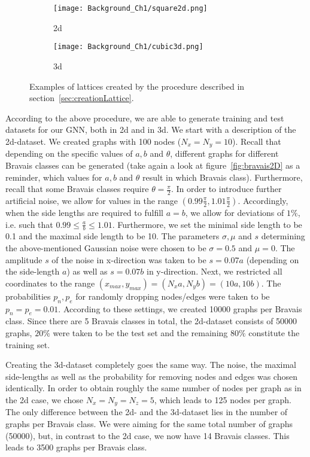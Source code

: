\begin{figure}
    \centering
    \begin{subfigure}[t]{0.45\textwidth}
        \centering
        \texttt{[image: Background\_Ch1/square2d.png]}
        \caption{2d}
    \end{subfigure}
    \hfill
    \begin{subfigure}[t]{0.45\textwidth}
        \centering
        \texttt{[image: Background\_Ch1/cubic3d.png]}
        \caption{3d}
    \end{subfigure}
    \caption{Examples of lattices created by the procedure described in section~\ref{sec:creationLattice}.}
    \label{fig:examplesLattices}
\end{figure}

According to the above procedure, we are able to generate training and test datasets for our GNN, both in 2d and in 3d.
We start with a description of the 2d-dataset. We created graphs with 100 nodes ($N_x=N_y=10$).
Recall that depending on the specific values of $a,b$ and $\theta$, different graphs for different Bravais classes can be generated 
(take again a look at figure~\ref{fig:bravais2D} as a reminder, which values for $a,b$ and $\theta$ result in which Bravais class).
Furthermore, recall that some Bravais classes require $\theta=\frac{\pi}{2}$. In order to introduce further artificial noise, we allow for values
in the range $(0.99\frac{\pi}{2}, 1.01\frac{\pi}{2})$.
Accordingly, when the side lengths are required to fulfill $a=b$, we allow for deviations of $1\%$, 
i.e. such that $0.99\leq\frac{a}{b}\leq1.01$.
Furthermore, we set the minimal side length to be 0.1 and the maximal side length to be 10. 
The parameters $\sigma,\mu$ and $s$ determining the above-mentioned Gaussian noise were chosen to be $\sigma=0.5$ and $\mu=0$. The amplitude $s$ of
the noise in x-direction was taken to be $s=0.07a$ (depending on the side-length $a$) as well as $s=0.07b$
in y-direction. Next, we restricted all coordinates to the range $(x_{max},y_{max})=(N_xa,N_yb)=(10a,10b)$.
The probabilities $p_n,p_e$ for randomly dropping nodes/edges were taken to be $p_n=p_e=0.01$.
According to these settings, we created 10000 graphs per Bravais class. Since there are 5 Bravais classes in total, the
2d-dataset consists of 50000 graphs, $20\%$ were taken to be the test set and the remaining $80\%$ constitute the training set.

Creating the 3d-dataset completely goes the same way. The noise, the maximal side-lengths as well as the probability
for removing nodes and edges was chosen identically. In order to obtain roughly the same number of nodes per graph as in the 2d case,
we chose $N_x=N_y=N_z=5$, which leads to 125 nodes per graph.
The only difference between the 2d- and the 3d-dataset lies in the number of graphs per Bravais class. We were aiming
for the same total number of graphs (50000), but, in contrast to the 2d case, we now have 14 Bravais classes.
This leads to 3500 graphs per Bravais class.